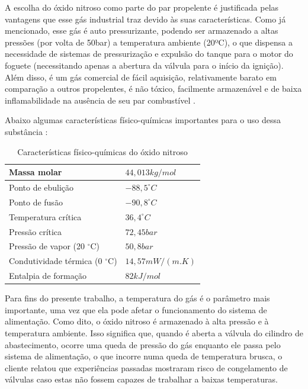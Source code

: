 A escolha do óxido nitroso como parte do par propelente é justificada pelas vantagens que esse gás industrial traz devido às suas características. Como já mencionado, esse gás é auto pressurizante, podendo ser armazenado a altas pressões (por volta de 50bar) a temperatura ambiente (20ºC), o que dispensa a necessidade de sistemas de pressurização e expulsão do tanque para o motor do foguete (necessitando apenas a abertura da válvula para o início da ignição). Além disso, é um gás comercial de fácil aquisição, relativamente barato em comparação a outros propelentes, é não tóxico, facilmente armazenável e de baixa inflamabilidade na ausência de seu par combustível \cite{rogerapazavasquez2017}. 

Abaixo algumas características físico-químicas importantes para o uso dessa substância \cite{rogerapazavasquez2017}: 

\begin{table}[H]
\centering
\begin{tabular}{|l|l|}
\hline
Massa molar & $44,013 kg/mol$ \\ \hline
Ponto de ebulição & $-88,5 ^{\circ}C$  \\ \hline
Ponto de fusão & $-90,8 ^{\circ}C$  \\ \hline
Temperatura crítica & $36,4 ^{\circ}C$ \\ \hline
Pressão crítica & $72,45 bar$  \\ \hline
Pressão de vapor (20 $^{\circ}$C) & $50,8 bar$  \\ \hline
Condutividade térmica (0 $^{\circ}$C) & $14,57 mW/(m.K)$  \\ \hline
Entalpia de formação & $82 kJ/mol$  \\ \hline
\end{tabular}
\caption{Características físico-químicas do óxido nitroso}
\label{tab:n2o}
\end{table}

\par Para fins do presente trabalho, a temperatura do gás é o parâmetro mais importante, uma vez que ela pode afetar o funcionamento do sistema de alimentação. Como dito, o óxido nitroso é armazenado à alta pressão e à temperatura ambiente. Isso significa que, quando é aberta a válvula do cilindro de abastecimento, ocorre uma queda de pressão do gás enquanto ele passa pelo sistema de alimentação, o que incorre numa queda de temperatura brusca, o cliente relatou que experiências passadas mostraram risco de congelamento de válvulas caso estas não fossem capazes de trabalhar a baixas temperaturas. 

